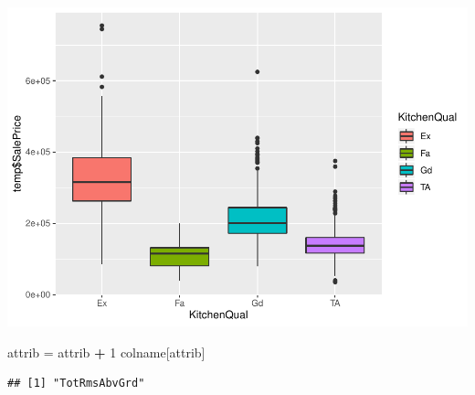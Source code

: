 \documentclass[]{article}
\newenvironment{Shaded}{\begin{snugshade}}{\end{snugshade}}
\newcommand{\DecValTok}[1]{\textcolor[rgb]{0.00,0.00,0.81}{#1}}
\newcommand{\StringTok}[1]{\textcolor[rgb]{0.31,0.60,0.02}{#1}}
\newcommand{\OperatorTok}[1]{\textcolor[rgb]{0.81,0.36,0.00}{\textbf{#1}}}
\newcommand{\NormalTok}[1]{#1}
\begin{document}
\includegraphics{EDA_files/figure-latex/unnamed-chunk-76-1.pdf}

\begin{Shaded}
\begin{Highlighting}[]
\NormalTok{attrib =}\StringTok{ }\NormalTok{attrib }\OperatorTok{+}\StringTok{ }\DecValTok{1}
\NormalTok{colname[attrib]}
\end{Highlighting}
\end{Shaded}

\begin{verbatim}
## [1] "TotRmsAbvGrd"
\end{verbatim}
\end{document}

